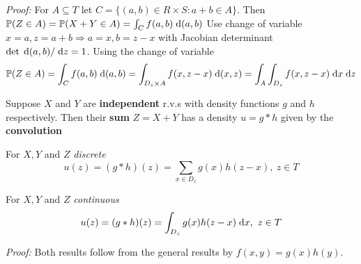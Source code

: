 \emph{Proof:} For $A \subseteq T$ let $C = \{(a, b) \in R \times S : a + b \in A\}$.
Then $\mathbb{P}(Z \in A) = \mathbb{P}(X + Y \in A) = \int_{C} f(a, b) \; \text{d} (a,b)$
Use change of variable $x = a, z = a + b \Rightarrow a = x, b = z - x$ with Jacobian determinant $\det \; \text{d} (a, b)/ \; \text{d} z = 1$.
Using the change of variable
\begin{equation}
\mathbb{P}(Z \in A) = \int_{C} f(a, b) \; \text{d} (a,b) = \int_{D_z \times A} f(x, z-x) \; \text{d} (x,z) = \int_A \int_{D_z} f(x, z-x) \; \text{d} x \; \text{d} z
\end{equation}

Suppose $X$ and $Y$ are \textbf{independent} r.v.s with density functions $g$ and $h$ respectively. 
Then their \textbf{sum} $Z = X + Y$ has a density $u = g * h$ given by the \textbf{convolution}

For $X, Y$ and $Z$ \emph{discrete}
\begin{equation}
u(z) = (g * h)(z) = \sum_{x \in D_z} g(x) h(z - x), \ z \in T
\end{equation}

For $X, Y$ and $Z$ \emph{continuous}
\begin{equation}
u(z) = (g * h)(z) = \int_{D_z} g(x) h(z - x) \; \text{d} x, \ z \in T
\end{equation}

\emph{Proof:} Both results follow from the general results by $f(x,y) = g(x)h(y)$.
